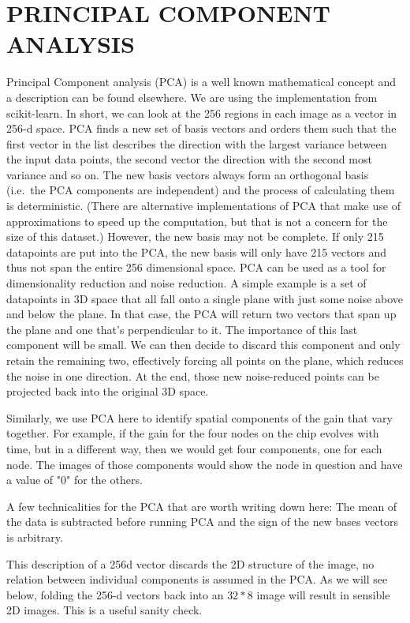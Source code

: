 \documentclass[]{spie}  %
\begin{document}
\section{PRINCIPAL COMPONENT ANALYSIS}
Principal Component analysis (PCA) is a well known mathematical concept and a description can be found elsewhere. We are using the implementation from scikit-learn\cite{scikit-learn}. In short, we can look at the 256 regions in each image as a vector in 256-d space. PCA finds a new set of basis vectors and orders them such that the first vector in the list describes the direction with the largest variance between the input data points, the second vector the direction with the second most variance and so on. The new basis vectors always form an orthogonal basis (i.e.\ the PCA components are independent) and the process of calculating them is deterministic. (There are alternative implementations of PCA that make use of approximations to speed up the computation, but that is not a concern for the size of this dataset.) However, the new basis may not be complete. If only 215 datapoints are put into the PCA, the new basis will only have 215 vectors and thus not span the entire 256 dimensional space. PCA can be used as a tool for dimensionality reduction and noise reduction. A simple example is a set of datapoints in 3D space that all fall onto a single plane with just some noise above and below the plane. In that case, the PCA will return two vectors that span up the plane and one that's perpendicular to it. The importance of this last component will be small. We can then decide to discard this component and only retain the remaining two, effectively forcing all points on the plane, which reduces the noise in one direction. At the end, those new noise-reduced points can be projected back into the original 3D space.

Similarly, we use PCA here to identify spatial components of the gain that vary together. For example, if the gain for the four nodes on the chip evolves with time, but in a different way, then we would get four components, one for each node. The images of those components would show the node in question and have a value of "0" for the others.

A few technicalities for the PCA that are worth writing down here: The mean of the data is subtracted before running PCA and the sign of the new bases vectors is arbitrary.

This description of a 256d vector discards the 2D structure of the image, no relation between individual components is assumed in the PCA. As we will see below, folding the 256-d vectors back into an $32 * 8$ image will result in sensible 2D images. This is a useful sanity check.
\end{document}
